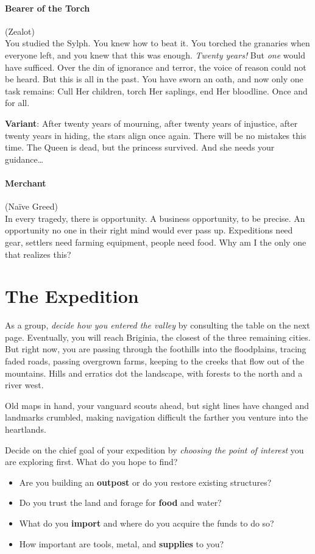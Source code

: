 \documentclass{zine}
\begin{document}
\paragraph{Bearer of the Torch} (Zealot)\\
You studied the Sylph. You knew how to beat it.
You torched the granaries when everyone left, and you knew that this was
enough. \emph{Twenty years!} But \emph{one} would have sufficed. Over
the din of ignorance and terror, the voice of reason could not be heard.
But this is all in the past. You have sworn an oath, and now only one
task remains: Cull Her children, torch Her saplings, end Her bloodline.
Once and for all.

\textbf{Variant}: After twenty years of mourning, after twenty years of
injustice, after twenty years in hiding, the stars align once again.
There will be no mistakes this time. The Queen is dead, but the princess
survived. And she needs your guidance…

\paragraph{Merchant}
(Naïve Greed)\\
In every tragedy, there is opportunity. A business
opportunity, to be precise. An opportunity no one in their right mind
would ever pass up. Expeditions need gear, settlers need farming
equipment, people need food. Why am I the only one that realizes this?



\section{The Expedition}

As a group, \textit{decide how you entered the valley} by consulting the table on the next page.
Eventually, you will reach Briginia, the closest of the three remaining cities.
But right now, you are passing through the foothills into the floodplains, tracing faded roads, passing overgrown farms, keeping to the creeks that flow out of the mountains.
Hills and erratics dot the landscape, with forests to the north and a river west.

Old maps in hand, your vanguard scouts ahead, but sight lines have changed and landmarks crumbled, making navigation difficult the farther you venture into the heartlands.

Decide on the chief goal of your expedition by \textit{choosing the point of interest} you are exploring first. What do you hope to find?
\begin{itemize}
	\item Are you building an \textbf{outpost} or do you restore existing structures?
	\item Do you trust the land and forage for \textbf{food} and water?
	\item What do you \textbf{import} and where do you acquire the funds to do so?
	\item How important are tools, metal, and \textbf{supplies} to you?
\end{itemize}
\end{document}
